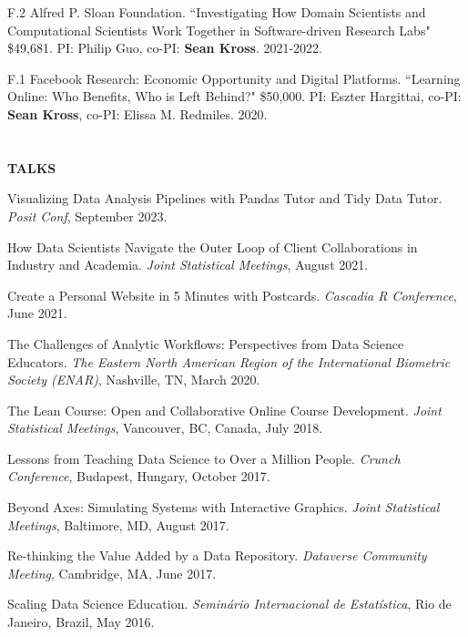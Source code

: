 \begin{bibenum}

\item[F.2] Alfred P. Sloan Foundation. ``Investigating How Domain Scientists and Computational Scientists Work Together in Software-driven Research Labs" \$49,681. PI: Philip Guo, co-PI: \textbf{Sean Kross}. 2021-2022.

\item[F.1] Facebook Research: Economic Opportunity and Digital Platforms. ``Learning Online: Who Benefits, Who is Left Behind?" \$50,000. PI: Eszter Hargittai, co-PI: \textbf{Sean Kross}, co-PI: Elissa M. Redmiles. 2020.

\end{bibenum}

\vspace{0.1in}

\section{} \textbf{TALKS} \vspace{0.05in}

\begin{innerlist}
\item Visualizing Data Analysis Pipelines with Pandas Tutor and Tidy Data Tutor. \textit{Posit Conf}, September 2023.
\item How Data Scientists Navigate the Outer Loop of Client Collaborations in Industry and Academia. \textit{Joint Statistical Meetings}, August 2021.
\item Create a Personal Website in 5 Minutes with Postcards. \textit{Cascadia R Conference}, June 2021.
\item The Challenges of Analytic Workflows: Perspectives from Data Science Educators. \textit{The Eastern North American Region of the International Biometric Society (ENAR)}, Nashville, TN, March 2020.
\item The Lean Course: Open and Collaborative Online Course Development. \textit{Joint Statistical Meetings}, Vancouver, BC, Canada, July 2018.
\item Lessons from Teaching Data Science to Over a Million People. \textit{Crunch Conference}, Budapest, Hungary, October 2017.
\item Beyond Axes: Simulating Systems with Interactive Graphics. \textit{Joint Statistical Meetings}, Baltimore, MD, August 2017.
\item Re-thinking the Value Added by a Data Repository. \textit{Dataverse Community Meeting}, Cambridge, MA, June 2017.
\item Scaling Data Science Education. \textit{Seminário Internacional de Estatística}, Rio de Janeiro, Brazil, May 2016.
\end{innerlist}

